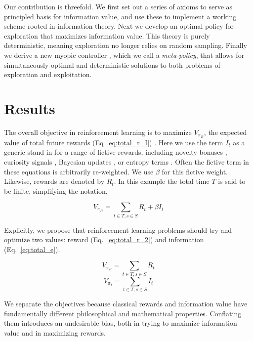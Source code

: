 \documentclass[9pt,twocolumn,twoside]{pnas-new}
\begin{document}
Our contribution is threefold. We first set out a series of axioms to serve as principled basis for information value, and use these to implement a working scheme rooted in information theory. Next we develop an optimal policy for exploration that maximizes information value. This theory is purely deterministic, meaning exploration no longer relies on random sampling. Finally we derive a new myopic controller \cite{Hocker2017}, which we call a \textit{meta-policy}, that allows for simultaneously optimal and deterministic solutions to both problems of exploration and exploitation. 


\section*{Results}
The overall objective in reinforcement learning is to maximize $V_{\pi_R}$, the expected value of total future rewards (Eq~\ref{eq:total_r_I}) \cite{Sutton2018}. Here we use the term $I_t$ as a generic stand in for a range of fictive rewards, including novelty bonuses \cite{Kakade2002}, curiosity signals \cite{Pathak2017}, Bayesian updates \cite{Radulescu2019}, or entropy terms \cite{Haarnoja2015,Haarnoja2017}.  Often the fictive term in these equations is arbitrarily re-weighted. We use $\beta$ for this fictive weight. Likewise, rewards are denoted by $R_t$. In this example the total time $T$ is said to be finite, simplifying the notation.

\begin{equation}
    V_{\pi_R} = \sum_{t \in T, s \in S} R_t + \beta I_t
    \label{eq:total_r_I}
\end{equation}

Explicitly, we propose that reinforcement learning problems should try and optimize two values: reward (Eq.~\ref{eq:total_r_2}) and information (Eq.~\ref{eq:total_e}). 

\begin{multicols}{2}
  \begin{equation}
    V_{\pi_R} = \sum_{t \in T, s \in S} R_t
    \label{eq:total_r_2}
  \end{equation} \break
  \begin{equation}
    V_{\pi_I} = \sum_{t \in T, s \in S} I_t
    \label{eq:total_e}
  \end{equation}
\end{multicols}

We separate the objectives because classical rewards and information value have fundamentally different philosophical and mathematical properties. Conflating them introduces an undesirable bias, both in trying to maximize information value and in maximizing rewards.
\end{document}
